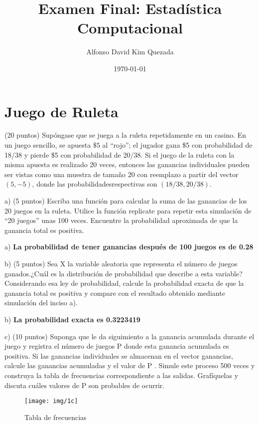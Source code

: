 \documentclass[11pt]{article}
\title{\textbf{Examen Final: Estadística Computacional}}
\author{Alfonso David Kim Quezada}
\date{\today}
\begin{document}
\maketitle

\section{Juego de Ruleta}
\noindent (20 puntos) Supóngase que se juega a la ruleta repetidamente en un casino. En un juego sencillo, se apuesta $\$5$ al ``rojo''; el jugador gana \$5 con probabilidad de 18/38 y pierde \$5 con probabilidad de 20/38. Si el juego de la ruleta con la misma apuesta es realizado 20 veces, entonces las ganancias individuales pueden ser vistas como una muestra de tamaño 20 con reemplazo a partir del vector $(5,-5) $, donde las probabilidadesrespectivas son $(18/38, 20/38)$.

\noindent a) (5 puntos) Escriba una función para calcular la suma de las ganancias de los 20 juegos en la ruleta. Utilice la función replicate para repetir esta simulación de ``20 juegos'' unas 100 veces. Encuentre la probabilidad aproximada de que la ganancia total es positiva.

\noindent a) \textbf{ La probabilidad de tener ganancias después de 100 juegos es de 0.28 }

\noindent b) (5 puntos) Sea X la variable aleatoria que representa el número de juegos ganados.¿Cuál es la distribución de probabilidad que describe a esta variable? Considerando esa ley de probabilidad, calcule la probabilidad exacta de que la ganancia total es positiva y compare con el resultado obtenido mediante simulación del inciso a).

\noindent b) \textbf{ La probabilidad exacta es 0.3223419 }

\noindent c) (10 puntos) Suponga que le da siguimiento a la ganancia acumulada durante el juego y registra el número de juegos P donde esta ganancia acumulada es positiva. Si las ganancias individuales se almacenan en el vector ganancias, calcule las ganancias acumuladas y el valor de P . Simule este proceso 500 veces y construya la tabla de frecuencias correspondiente a las salidas. Grafíquelas y discuta cuáles valores de P son probables de ocurrir.

\begin{figure} [H]
	\texttt{[image: img/1c]}
	\caption[]{Tabla de frecuencias}
\label{fig:fig1}
\end{figure}
\end{document}
